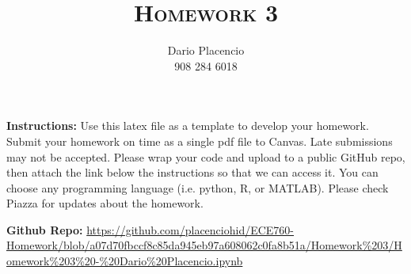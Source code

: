 \documentclass[a4paper]{article}
\title{\textsc{Homework 3}} %
\author{Dario Placencio\\908 284 6018}
\date{}
\theoremstyle{definition}
\begin{document}
\maketitle 


\textbf{Instructions:} 
Use this latex file as a template to develop your homework. Submit your homework on time as a single pdf file to Canvas. Late submissions may not be accepted. Please wrap your code and upload to a public GitHub repo, then attach the link below the instructions so that we can access it. You can choose any programming language (i.e. python, R, or MATLAB). Please check Piazza for updates about the homework.


\textbf{Github Repo:}
\url{https://github.com/placenciohid/ECE760-Homework/blob/a07d70fbccf8c85da945eb97a608062c0fa8b51a/Homework%203/Homework%203%20-%20Dario%20Placencio.ipynb}
	
\end{document}
